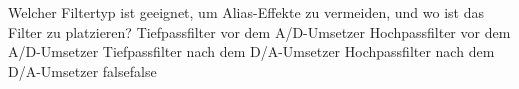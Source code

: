     {Welcher Filtertyp ist geeignet, um Alias-Effekte zu vermeiden, und wo ist das Filter zu platzieren?}
    {Tiefpassfilter vor dem A/D-Umsetzer}
    {Hochpassfilter vor dem A/D-Umsetzer}
    {Tiefpassfilter nach dem D/A-Umsetzer}
    {Hochpassfilter nach dem D/A-Umsetzer}
    {false}{false}